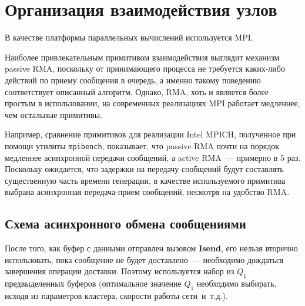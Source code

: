 \documentclass[12pt,a4paper,fleqn]{article}
\newcommand{\Code}[1]{\textbf{\mbox{#1}}}
\newcommand\etc{~и~т.д.}
\begin{document}


\section{Организация взаимодействия узлов}

В качестве платформы параллельных вычислений используется MPI.

Наиболее привлекательным примитивом взаимодействия выглядит механизм passive RMA,
поскольку от принимающего процесса не требуется каких-либо действий по приему сообщения в
очередь, а именно такому поведению соответствует описанный алгоритм. Однако, RMA, хоть и
является более простым в использовании, на современных реализациях MPI работает медленнее,
чем остальные примитивы. 

Например, сравнение примитивов для реализации Intel MPICH, полученное при помощи утилиты
\texttt{mpibench}, показывает, что passive RMA почти на порядок медленнее асинхронной
передачи сообщений, а active RMA~--- примерно в 5 раз. Поскольку ожидается, что задержки
на передачу сообщений будут составлять существенную часть времени генерации, в качестве
используемого примитива выбрана асинхронная передача-прием сообщений, несмотря на удобство
RMA.

\subsection{Схема асинхронного обмена сообщениями}

После того, как буфер с данными отправлен вызовом \Code{Isend}, его нельзя вторично
использовать, пока сообщение не будет доставлено~--- необходимо дождаться завершения
операции доставки. Поэтому используется набор из $Q_1$ предвыделенных буферов (оптимальное
значение $Q_1$ необходимо выбирать, исходя из параметров кластера, скорости работы
сети\etc).
\end{document}
